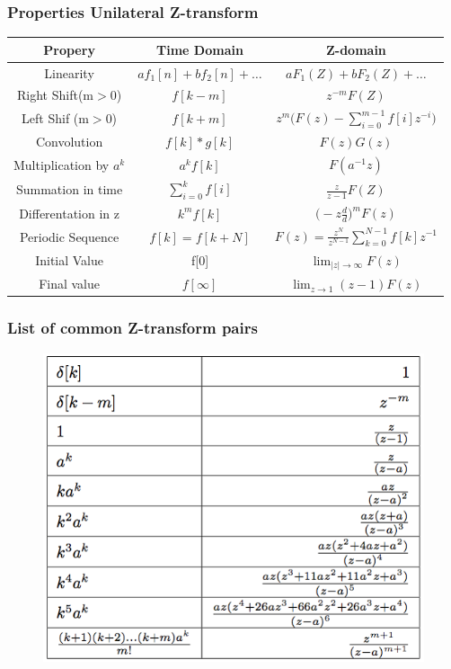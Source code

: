 \begin{frame}
	\frametitle{Properties Unilateral Z-transform}
		\begin{tabular}{|c|c|c|}
			\hline  Propery & Time Domain & Z-domain  \\ 
			\hline  Linearity & $af_1[n]+bf_2[n] + \dots  $& $aF_1(Z)+bF_2(Z)+\dots$ \\ 
			\hline  Right Shift(m$>$0)& $f[k-m]$  &$z^{-m}F(Z)$  \\ 
			\hline  Left Shif (m$>$0)& $f[k+m] $  & $ z^m\bigg(F(z)-\sum\limits_{i=0}^{m-1}f[i]z^{-i} \bigg)$ \\ 
			\hline  Convolution & $f[k]\ast g[k] $  & $F(z)G(z) $ \\ 
			\hline  Multiplication by $a^{k}$ & $a^{k}f[k]$  & $F(a^{-1}z)$  \\ 
			\hline  Summation in time& $\sum\limits_{i=0}^{k}f[i]$  & $\frac{z}{z-1}F(Z) $\\ 
			\hline  Differentation in z& $k^mf[k]$ & $\big(-z \frac{d}{d}\big)^{m} F(z)$ \\ 
			\hline  Periodic Sequence & $f[k] = f[k+N]$  & $F(z) = \frac{z^N}{z^{N-1}}\sum\limits_{k=0}^{N-1}f[k]z^{-1}$  \\ 
			\hline  Initial Value& f[0] &$ \lim_{\mid z \mid \to \infty} F(z) $  \\ 
			\hline  Final value & $f[\infty] $ & $\lim_{z \to 1} (z-1)F(z) $ \\ 
			\hline 
		\end{tabular} 
\end{frame}
\begin{frame}
	\frametitle{List of common Z-transform pairs}
	\begin{figure}
\centering
\includegraphics[height=0.8\textheight]{Images/discrete_time_systems_22}

\label{fig:discrete_time_systems_22}
\end{figure}

	
\end{frame}
